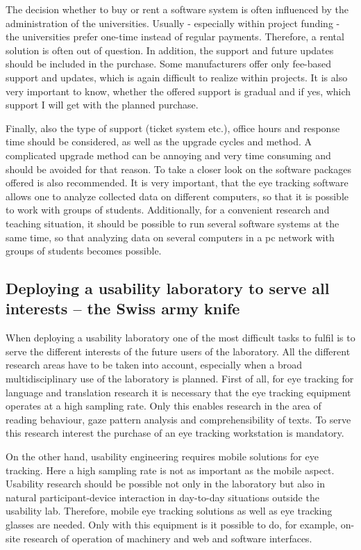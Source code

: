 \documentclass[output=paper]{langsci/langscibook}
\begin{document}
The decision whether to buy or rent a software system is often influenced by the administration of the universities. Usually - especially within project funding - the universities prefer one-time instead of regular payments. Therefore, a rental solution is often out of question. In addition, the support and future updates should be included in the purchase. Some manufacturers offer only fee-based support and updates, which is again difficult to realize within projects. It is also very important to know, whether the offered support is gradual and if yes, which support I will get with the planned purchase.


Finally, also the type of support (ticket system etc.), office hours and response time should be considered, as well as the upgrade cycles and method. A complicated upgrade method can be annoying and very time consuming and should be avoided for that reason. To take a closer look on the software packages offered is also recommended. It is very important, that the eye tracking software allows one to analyze collected data on different computers, so that it is possible to work with groups of students. Additionally, for a convenient research and teaching situation, it should be possible to run several software systems at the same time, so that analyzing data on several computers in a pc network with groups of students becomes possible.


\subsection{Deploying a usability laboratory to serve all interests – the Swiss army knife }

When deploying a usability laboratory one of the most difficult tasks to fulfil is to serve the different interests of the future users of the laboratory. All the different research areas have to be taken into account, especially when a broad multidisciplinary use of the laboratory is planned. First of all, for eye tracking for language and translation research it is necessary that the eye tracking equipment operates at a high sampling rate. Only this enables research in the area of reading behaviour, gaze pattern analysis and comprehensibility of texts. To serve this research interest the purchase of an eye tracking workstation is mandatory.


On the other hand, usability engineering requires mobile solutions for eye tracking. Here a high sampling rate is not as important as the mobile aspect. Usability research should be possible not only in the laboratory but also in natural participant-device interaction in day-to-day situations outside the usability lab. Therefore, mobile eye tracking solutions as well as eye tracking glasses are needed. Only with this equipment is it possible to do, for example, on-site research of operation of machinery and web and software interfaces. 
\end{document}
